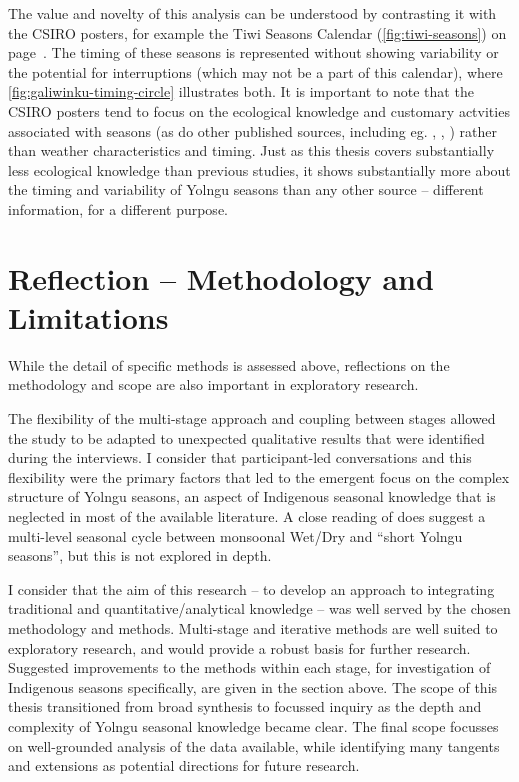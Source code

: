 
The value and novelty of this analysis can be understood by contrasting it with the CSIRO
posters, for example the Tiwi Seasons Calendar (\cref{fig:tiwi-seasons}) on
page~\pageref{fig:tiwi-seasons}.  The timing of these seasons is represented
without showing variability or the potential for interruptions (which may not
be a part of this calendar), where \cref{fig:galiwinku-timing-circle}
illustrates both.
%
It is important to note that the CSIRO posters tend to focus on the ecological knowledge and
customary actvities associated with seasons (as do other published sources,
including eg. \citealp{barber2005}, , \citealp{davis1989}) rather than weather
characteristics and timing.  Just as this thesis covers substantially less
ecological knowledge than previous studies, it shows substantially more
about the timing and variability of Yolngu seasons than any other source --
different information, for a different purpose.


\section{Reflection -- Methodology and Limitations}
\label{sec:disc-reflection}

While the detail of specific methods is assessed above, reflections on the
methodology and scope are also important in exploratory research.

The flexibility of the multi-stage approach and coupling between stages
allowed the study to be adapted to unexpected qualitative results that were
identified during the interviews.  I consider
that participant-led conversations and this flexibility were the primary
factors that led to the emergent focus on the complex structure of
Yolngu seasons, an aspect of Indigenous seasonal knowledge that is neglected
in most of the available literature.  A close reading of \citet[][eg. p89]{barber2005}
does suggest a multi-level seasonal cycle between monsoonal Wet/Dry and
``short Yolngu seasons'', but this is not explored in depth.

I consider that the aim of this research -- to develop an approach to
integrating traditional and quantitative/analytical knowledge -- was well
served by the chosen methodology and methods.  Multi-stage and iterative
methods are well suited to exploratory research, and would provide a robust
basis for further research.  Suggested improvements to the methods within
each stage, for investigation of Indigenous seasons specifically, are given
in the section above.  The scope of this thesis transitioned from broad
synthesis to focussed inquiry as the depth and complexity of Yolngu seasonal
knowledge became clear.  The final scope focusses on well-grounded analysis
of the data available, while identifying many tangents and extensions as
potential directions for future research.

